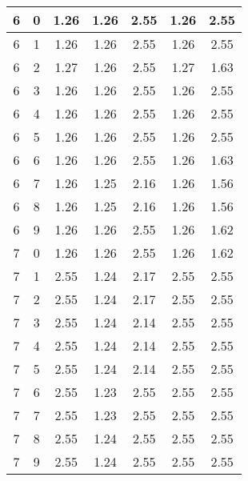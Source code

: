\begin{longtable}{|c|c||c||c|c||c|c|}
	6 & 0 & 1.26 & 1.26 & 2.55 & 1.26 & 2.55 \\ \hline
	6 & 1 & 1.26 & 1.26 & 2.55 & 1.26 & 2.55 \\ \hline
	6 & 2 & 1.27 & 1.26 & 2.55 & 1.27 & 1.63 \\ \hline
	6 & 3 & 1.26 & 1.26 & 2.55 & 1.26 & 2.55 \\ \hline
	6 & 4 & 1.26 & 1.26 & 2.55 & 1.26 & 2.55 \\ \hline
	6 & 5 & 1.26 & 1.26 & 2.55 & 1.26 & 2.55 \\ \hline
	6 & 6 & 1.26 & 1.26 & 2.55 & 1.26 & 1.63 \\ \hline
	6 & 7 & 1.26 & 1.25 & 2.16 & 1.26 & 1.56 \\ \hline
	6 & 8 & 1.26 & 1.25 & 2.16 & 1.26 & 1.56 \\ \hline
	6 & 9 & 1.26 & 1.26 & 2.55 & 1.26 & 1.62 \\ \hline
	7 & 0 & 1.26 & 1.26 & 2.55 & 1.26 & 1.62 \\ \hline
	7 & 1 & 2.55 & 1.24 & 2.17 & 2.55 & 2.55 \\ \hline
	7 & 2 & 2.55 & 1.24 & 2.17 & 2.55 & 2.55 \\ \hline
	7 & 3 & 2.55 & 1.24 & 2.14 & 2.55 & 2.55 \\ \hline
	7 & 4 & 2.55 & 1.24 & 2.14 & 2.55 & 2.55 \\ \hline
	7 & 5 & 2.55 & 1.24 & 2.14 & 2.55 & 2.55 \\ \hline
	7 & 6 & 2.55 & 1.23 & 2.55 & 2.55 & 2.55 \\ \hline
	7 & 7 & 2.55 & 1.23 & 2.55 & 2.55 & 2.55 \\ \hline
	7 & 8 & 2.55 & 1.24 & 2.55 & 2.55 & 2.55 \\ \hline
	7 & 9 & 2.55 & 1.24 & 2.55 & 2.55 & 2.55 \\ \hline
\end{longtable}

